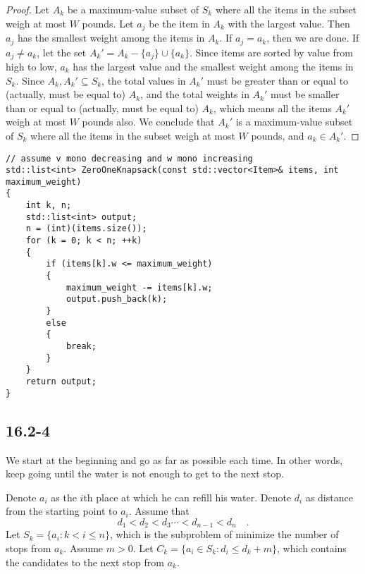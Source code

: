 \begin{proof}
    Let $A_k$ be a maximum-value subset of $S_k$
    where all the items in the subset weigh at most $W$ pounds.
    Let $a_j$ be the item in $A_k$ with the largest value.
    Then $a_j$ has the smallest weight among the items in $A_k$.
    If $a_j = a_k$, then we are done.
    If $a_j \neq a_k$, let the set $A_k' = A_k - \{ a_j \} \cup \{ a_k \}$.
    Since items are sorted by value from high to low,
    $a_k$ has the largest value and the smallest weight among the items in $S_k$.
    Since $A_k, A_k' \subseteq S_k$, 
    the total values in $A_k'$ must be greater than or equal to (actually, must be equal to) $A_k$,
    and the total weights in $A_k'$ must be smaller than or equal to (actually, must be equal to) $A_k$,
    which means all the items $A_k'$ weigh at most $W$ pounds also.
    We conclude that $A_k'$ is a maximum-value subset of $S_k$
    where all the items in the subset weigh at most $W$ pounds,
    and $a_k \in A_k'$.
\end{proof}
    
\begin{verbatim}
// assume v mono decreasing and w mono increasing
std::list<int> ZeroOneKnapsack(const std::vector<Item>& items, int maximum_weight)
{
    int k, n;
    std::list<int> output;
    n = (int)(items.size());
    for (k = 0; k < n; ++k)
    {
        if (items[k].w <= maximum_weight)
        {
            maximum_weight -= items[k].w;
            output.push_back(k);
        }
        else
        {
            break;
        }
    }
    return output;
}
\end{verbatim}

\subsection*{16.2-4}

We start at the beginning and go as far as possible each time.
In other words, keep going until the water is not enough to get to the next stop.

Denote $a_i$ as the $i$th place at which he can refill his water.
Denote $d_i$ as distance from the starting point to $a_i$.
Assume that
\begin{equation*}
    d_1 < d_2 < d_3 \cdots < d_{n-1} < d_n
    \quad .
\end{equation*}
Let $S_k = \{ a_i : k < i \leq n \}$, 
which is the subproblem of minimize the number of stops from $a_k$.
Assume $m > 0$.
Let $C_k = \{ a_i \in S_k : d_i \leq d_k + m \}$, 
which contains the candidates to the next stop from $a_k$.

